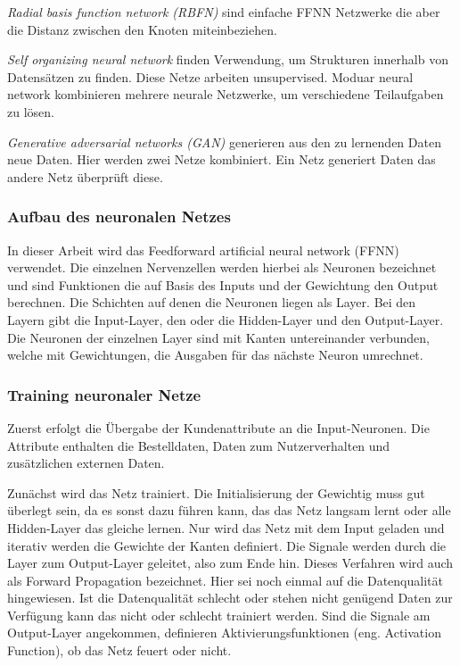 \textit{Radial basis function network (RBFN)} sind einfache FFNN Netzwerke die aber die Distanz zwischen den Knoten miteinbeziehen.\vspace{0.2cm}

\textit{Self organizing neural network} finden Verwendung, um Strukturen innerhalb von Datensätzen zu finden. Diese Netze arbeiten unsupervised.
Moduar neural network kombinieren mehrere neurale Netzwerke, um verschiedene Teilaufgaben zu lösen.\vspace{0.2cm}

\textit{Generative adversarial networks (GAN)} generieren aus den zu lernenden Daten neue Daten. Hier werden zwei Netze kombiniert. Ein Netz generiert Daten das andere Netz überprüft diese.

\subsubsection{Aufbau des neuronalen Netzes}
In dieser Arbeit wird das Feedforward artificial neural network (FFNN) verwendet. Die einzelnen Nervenzellen werden hierbei als Neuronen bezeichnet und sind Funktionen die auf Basis des Inputs und der Gewichtung den Output berechnen. Die Schichten auf denen die Neuronen liegen als Layer. Bei den Layern gibt die Input-Layer, den oder die Hidden-Layer und den Output-Layer. Die Neuronen der einzelnen Layer sind mit Kanten untereinander verbunden, welche mit Gewichtungen, die Ausgaben für das nächste Neuron umrechnet.
\subsubsection{Training neuronaler Netze}
Zuerst erfolgt die Übergabe der Kundenattribute an die Input-Neuronen. Die Attribute enthalten die Bestelldaten, Daten zum Nutzerverhalten und zusätzlichen externen Daten.\vspace{0.2cm}

Zunächst wird das Netz trainiert. Die Initialisierung der Gewichtig muss gut überlegt sein, da es sonst dazu führen kann, das das Netz langsam lernt oder alle Hidden-Layer das gleiche lernen. Nur wird das Netz mit dem Input geladen und iterativ werden die Gewichte der Kanten definiert. Die Signale werden durch die Layer zum Output-Layer geleitet, also zum Ende hin. Dieses Verfahren wird auch als Forward Propagation bezeichnet. Hier sei noch einmal auf die Datenqualität hingewiesen. Ist die Datenqualität schlecht oder stehen nicht genügend Daten zur Verfügung kann das nicht oder schlecht trainiert werden. Sind die Signale am Output-Layer angekommen, definieren Aktivierungsfunktionen (eng. Activation Function), ob das Netz feuert oder nicht.\vspace{0.2cm}

